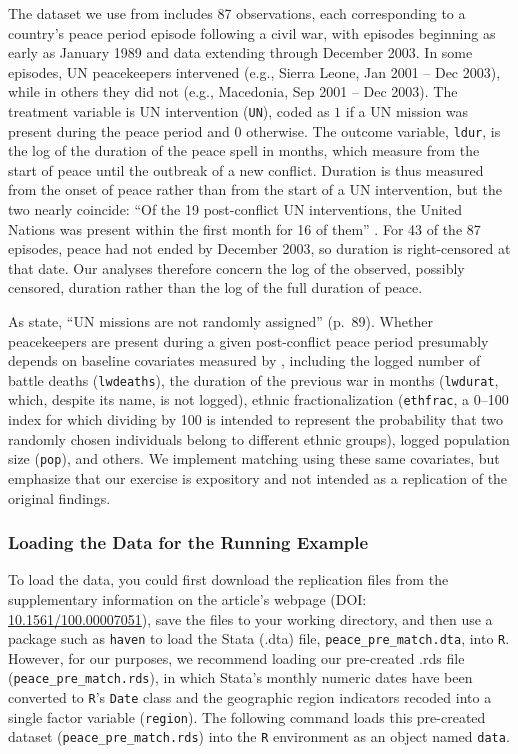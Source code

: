 \documentclass[
  12pt,
  leqno]{article}
\begin{document}
The dataset we use from \citet{gilligansergenti2008} includes 87
observations, each corresponding to a country's peace period episode
following a civil war, with episodes beginning as early as January 1989
and data extending through December 2003. In some episodes, UN
peacekeepers intervened (e.g., Sierra Leone, Jan 2001 -- Dec 2003),
while in others they did not (e.g., Macedonia, Sep 2001 -- Dec 2003).
The treatment variable is UN intervention (\texttt{UN}), coded as \(1\)
if a UN mission was present during the peace period and \(0\) otherwise.
The outcome variable, \texttt{ldur}, is the log of the duration of the
peace spell in months, which \citet{gilligansergenti2008} measure from
the start of peace until the outbreak of a new conflict. Duration is
thus measured from the onset of peace rather than from the start of a UN
intervention, but the two nearly coincide: ``Of the 19 post-conflict UN
interventions, the United Nations was present within the first month for
16 of them'' \citep[p.~118]{gilligansergenti2008}. For 43 of the 87
episodes, peace had not ended by December 2003, so duration is
right-censored at that date. Our analyses therefore concern the log of
the observed, possibly censored, duration rather than the log of the
full duration of peace.

As \citet{gilligansergenti2008} state, ``UN missions are not randomly
assigned'' (p.~89). Whether peacekeepers are present during a given
post-conflict peace period presumably depends on baseline covariates
measured by \citet{gilligansergenti2008}, including the logged number of
battle deaths (\texttt{lwdeaths}), the duration of the previous war in
months (\texttt{lwdurat}, which, despite its name, is not logged),
ethnic fractionalization (\texttt{ethfrac}, a 0--100 index for which
dividing by 100 is intended to represent the probability that two
randomly chosen individuals belong to different ethnic groups), logged
population size (\texttt{pop}), and others. We implement matching using
these same covariates, but emphasize that our exercise is expository and
not intended as a replication of the original findings.

\subsubsection{Loading the Data for the Running
Example}\label{loading-the-data-for-the-running-example}

To load the data, you could first download the replication files from
the supplementary information on the article's webpage (DOI:
\href{https://doi.org/10.1561/100.00007051}{10.1561/100.00007051}), save
the files to your working directory, and then use a package such as
\texttt{haven} to load the Stata (.dta) file,
\texttt{peace\_pre\_match.dta}, into \texttt{R}. However, for our
purposes, we recommend loading our pre-created .rds file
(\texttt{peace\_pre\_match.rds}), in which Stata's monthly numeric dates
have been converted to \texttt{R}'s \texttt{Date} class and the
geographic region indicators recoded into a single factor variable
(\texttt{region}). The following command loads this pre-created dataset
(\texttt{peace\_pre\_match.rds}) into the \texttt{R} environment as an
object named \texttt{data}.
\end{document}
